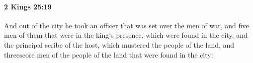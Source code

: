 
		\paragraph{2 Kings 25:19} %
			\label{2KINGS-25-19}

			And out of the city he took an officer that was set over the men of war, and five men of them that were in the king’s presence, which were found in the city, and the principal scribe of the host, which mustered the people of the land, and threescore men of the people of the land that were found in the city:


